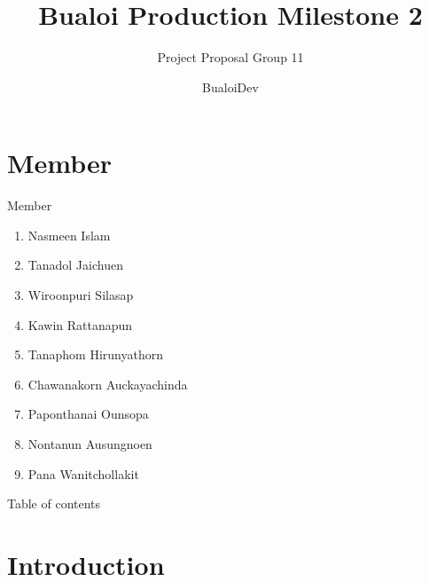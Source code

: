\documentclass[aspectratio=169]{beamer}
\title{
	Bualoi Production Milestone 2
}
\subtitle{
    Project Proposal Group 11
}
\author{
   BualoiDev 
}
\date{
}
\begin{document}
\frame{\titlepage}

\section{Member}
\begin{frame}{Member}
    \begin{enumerate}
        \item Nasmeen Islam
        \item Tanadol Jaichuen
        \item Wiroonpuri Silasap
        \item Kawin Rattanapun
        \item Tanaphom Hirunyathorn
        \item Chawanakorn Auckayachinda
        \item Paponthanai Ounsopa
        \item Nontanun Ausungnoen
        \item Pana Wanitchollakit
    \end{enumerate}
\end{frame}

\begin{frame}{Table of contents}
\end{frame}

\section{Introduction}
\end{document}
